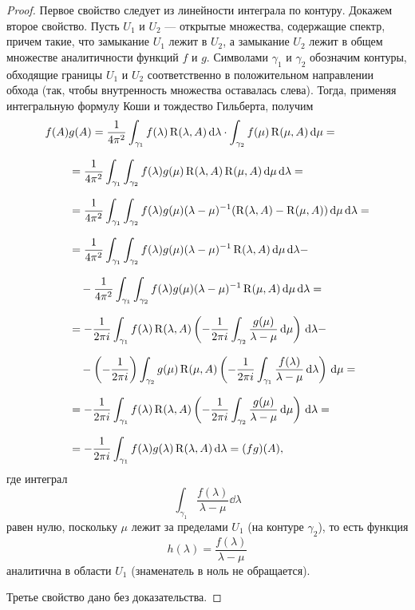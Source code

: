 \begin{proof}
    Первое свойство следует из линейности интеграла по контуру. Докажем второе свойство.    
    Пусть $U_1$ и $U_2$ --- открытые множества, содержащие спектр, причем такие, что замыкание 
    $U_1$ лежит в $U_2$, а замыкание $U_2$ лежит в общем множестве аналитичности функций $f$ и $g$.
    Символами $\gamma_1$ и $\gamma_2$ обозначим контуры, обходящие границы $U_1$ и $U_2$ 
    соответственно в положительном направлении обхода (так, чтобы внутренность множества 
    оставалась слева). Тогда, применяя интегральную формулу Коши и тождество Гильберта, получим
    \begin{align*}
        f(A)&g(A) = \frac{1}{4 \pi^2}\int_{\gamma_1} f(\lambda) \operatorname{R}(\lambda, A) \,\mathrm{d} \lambda
        \cdot 
        \int_{\gamma_2} f(\mu) \operatorname{R}(\mu, A) \,\mathrm{d} \mu = \\[0.7em]
        &= \frac{1}{4\pi^2} \int_{\gamma_1} \int_{\gamma_2} f(\lambda) g(\mu) 
        \operatorname{R}(\lambda, A) \operatorname{R}(\mu, A) \,\mathrm{d} \mu \,\mathrm{d} \lambda = \\[0.7em]
        &= \frac{1}{4\pi^2} \int_{\gamma_1} \int_{\gamma_2} f(\lambda) g(\mu) (\lambda - \mu)^{-1}
        (\operatorname{R}(\lambda, A) - \operatorname{R}(\mu, A)) \,\mathrm{d} \mu \,\mathrm{d} \lambda = \\[0.7em]
        &= \frac{1}{4\pi^2} \int_{\gamma_1} \int_{\gamma_2} f(\lambda) g(\mu) (\lambda - \mu)^{-1}
        \operatorname{R}(\lambda, A) \,\mathrm{d} \mu \,\mathrm{d} \lambda - \\[0.7em]
        &\quad- \frac{1}{4\pi^2} \int_{\gamma_1} \int_{\gamma_2} f(\lambda) g(\mu) (\lambda - \mu)^{-1}
        \operatorname{R}(\mu, A) \,\mathrm{d} \mu \,\mathrm{d} \lambda = \\[0.7em]
        &= -\frac{1}{2\pi i} \int_{\gamma_1} f(\lambda) \operatorname{R}(\lambda, A) \left( 
        -\frac{1}{2\pi i} \int_{\gamma_2} \frac{g(\mu)}{\lambda - \mu} \,\mathrm{d} \mu \right) 
        \,\mathrm{d} \lambda - \\[0.7em]
        &\quad- \left(-\frac{1}{2\pi i} \right) \int_{\gamma_2} g(\mu) \operatorname{R}(\mu, A) 
        \left( -\frac{1}{2\pi i} \int_{\gamma_1} \frac{f(\lambda)}{\lambda - \mu} \,\mathrm{d} \lambda \right) 
        \,\mathrm{d} \mu = \\[0.7em]
        &= -\frac{1}{2\pi i} \int_{\gamma_1} f(\lambda) \operatorname{R}(\lambda, A) \left( 
        -\frac{1}{2\pi i} \int_{\gamma_2} \frac{g(\mu)}{\lambda - \mu} \,\mathrm{d} \mu \right) 
        \,\mathrm{d} \lambda = \\[0.7em]
        &= -\frac{1}{2\pi i} \int_{\gamma_1} f(\lambda) g(\lambda) \operatorname{R}(\lambda, A)
        \,\mathrm{d} \lambda = (fg)(A),
    \end{align*}
    где интеграл
    \[ \int_{\gamma_1} \frac{f(\lambda)}{\lambda - \mu} \dd \lambda \]
    равен нулю, поскольку $\mu$ лежит за пределами $U_1$ (на контуре $\gamma_2$), то есть функция
    \[ h(\lambda) = \frac{f(\lambda)}{\lambda - \mu} \]
    аналитична в области $U_1$ (знаменатель в ноль не обращается).

    Третье свойство дано без доказательства.
\end{proof}


